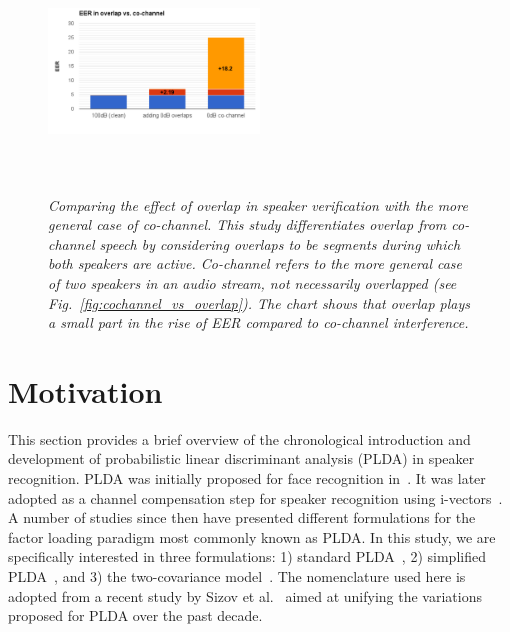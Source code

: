 \begin{figure}[h!]
	\vspace{-1mm}
	\centering
	\includegraphics[height = 2.5in, width=0.5\textwidth]{chapters/cochannelplda_jp/IEEEtran/figures/overlap_vs_cochannel_sid-crop}
	\vspace{-8mm}
	\caption{\it \small Comparing the effect of overlap in speaker verification with the more general case of co-channel. This study differentiates overlap from co-channel speech by considering overlaps to be segments during which both speakers are active. Co-channel refers to the more general case of two speakers in an audio stream, not necessarily overlapped (see Fig.~\ref{fig:cochannel_vs_overlap}). The chart shows that overlap plays a small part in the rise of EER compared to co-channel interference.}
	\label{fig:ovl_in_sid}
	\vspace{-1mm}
\end{figure}


\section{Motivation}
\label{sec:background}
This section provides a brief overview of the chronological introduction and development of probabilistic linear discriminant analysis (PLDA) in speaker recognition. 
PLDA was initially proposed for face recognition in~\cite{prince_plda}. 
It was later adopted as a channel compensation step for speaker recognition using i-vectors~\cite{kenny_first_plda}. 
A number of studies since then have presented different formulations for the factor loading paradigm most commonly known as PLDA. 
In this study, we are specifically interested in three formulations: 1) standard PLDA~\cite{kenny_plda}, 2) simplified PLDA~\cite{kenny_heavytailplda,garcia_plda}, and 3) the two-covariance model~\cite{brummer_plda}. 
The nomenclature used here is adopted from a recent study by Sizov et al.~\cite{sizov2014unifying} aimed at unifying the variations proposed for PLDA over the past decade. 


